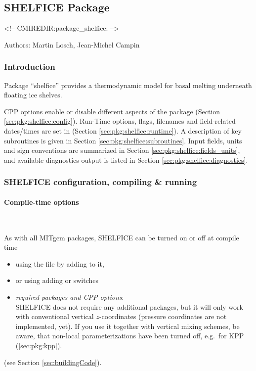 
\subsection{SHELFICE Package}
\label{sec:pkg:shelfice}
\begin{rawhtml}
<!-- CMIREDIR:package_shelfice: -->
\end{rawhtml}

Authors: Martin Losch, Jean-Michel Campin

\subsubsection{Introduction
\label{sec:pkg:shelfice:intro}}


Package ``shelfice'' provides a thermodynamic model for basal melting
underneath floating ice shelves.

CPP options enable or disable different aspects of the package
(Section \ref{sec:pkg:shelfice:config}).
Run-Time options, flags, filenames and field-related dates/times are
set in 
(Section \ref{sec:pkg:shelfice:runtime}).
A description of key subroutines is given in Section
\ref{sec:pkg:shelfice:subroutines}.
Input fields, units and sign conventions are summarized in
Section \ref{sec:pkg:shelfice:fields_units}, and available diagnostics
output is listed in Section \ref{sec:pkg:shelfice:diagnostics}.


\subsubsection{SHELFICE configuration, compiling \& running}

\paragraph{Compile-time options
\label{sec:pkg:shelfice:config}}
~

As with all MITgcm packages, SHELFICE can be turned on or off at compile time
%
\begin{itemize}
%
\item
using the  file by adding  to it,
%
\item
or using  adding
 or  switches
%
\item
\textit{required packages and CPP options}: \\
SHELFICE does not require any additional packages, but it will only
work with conventional vertical $z$-coordinates (pressure coordinates
are not implemented, yet). If you use it together with vertical mixing
schemes, be aware, that non-local parameterizations have been turned
off, e.g.\ for KPP (\ref{sec:pkg:kpp}).
%
\end{itemize}
(see Section \ref{sec:buildingCode}).

